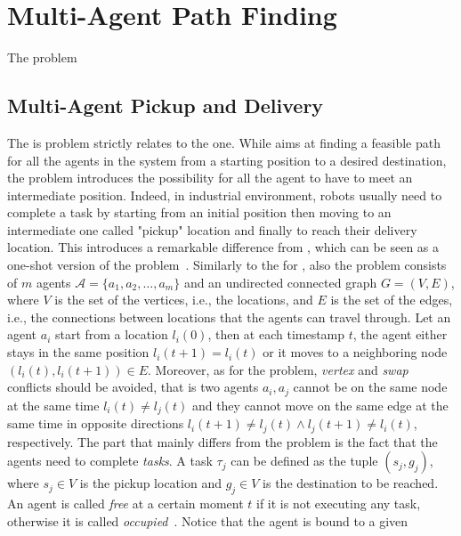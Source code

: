 \section{Multi-Agent Path Finding}
\label{sec:MAPF}
The  problem 


%
%
\subsection{Multi-Agent Pickup and Delivery}
The  is problem strictly relates to the  one. While \MAPF
aims at finding a feasible path for all the agents in the system from a
starting position to a desired destination, the  problem introduces
the possibility for all the agent to have to meet an intermediate position.
Indeed, in industrial environment, robots usually need to complete a task by
starting from an initial position then moving to an intermediate one called
"pickup" location and finally to reach their delivery location. \newline
This introduces a remarkable difference from \MAPF, which can be seen as a
one-shot version of the problem~\cite{onlineMAPD}.\newline
Similarly to the for \MAPF, also the  problem consists of $m$ agents
$\mathcal{A}=\{a_1,a_2,\hdots,a_m\}$ and an undirected connected graph 
$G=(V,E)$, where $V$ is the set of the vertices, i.e., the locations, and $E$
is the set of the edges, i.e., the connections between locations that the
agents can travel through. Let an agent $a_i$ start from a location $l_i(0)$,
then at each timestamp $t$, the agent either stays in the same position
$l_i(t+1)=l_i(t)$ or it moves to a neighboring node $(l_i(t), l_i(t+1))\in E$.
Moreover, as for the \MAPF problem, \textit{vertex} and \textit{swap} conflicts
should be avoided, that is two agents $a_i, a_j$ cannot be on the same node at 
the same time $l_i(t)\neq l_j(t)$ and they cannot move on the same edge at the
same time in opposite directions $l_i(t+1)\neq l_j(t) \wedge l_j(t+1)\neq
l_i(t)$, respectively. \newline
The part that mainly differs from the \MAPF problem is the fact that the agents
need to complete \textit{tasks}. A task $\tau_j$ can be defined as the tuple
$(s_j,g_j)$, where $s_j\in V$ is the pickup location and $g_j\in V$ is the 
destination to be reached. An agent is called \textit{free} at a certain moment
$t$ if it is not executing any task, otherwise it is called 
\textit{occupied}~\cite{onlineMAPD}. Notice that the agent is bound to a given
